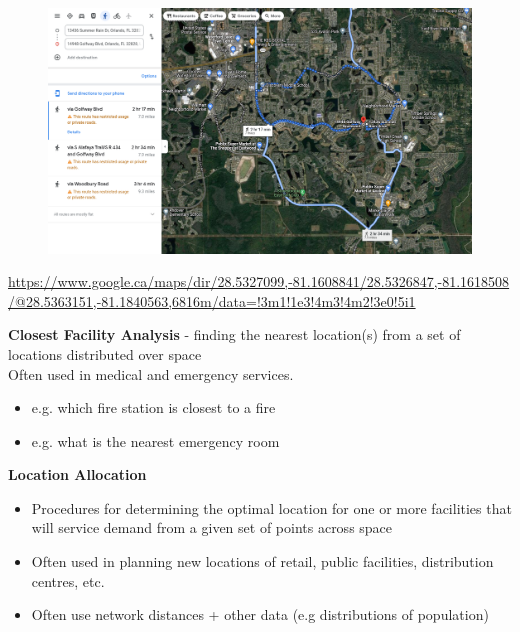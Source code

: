 \documentclass[aspectratio=169]{beamer}
\begin{document}
\begin{frame}
	
	\begin{figure}
		\centering
		\includegraphics[width=0.95 \linewidth]{images/stupid_route_orlando}
	\end{figure}
	\tiny \url{https://www.google.ca/maps/dir/28.5327099,-81.1608841/28.5326847,-81.1618508/@28.5363151,-81.1840563,6816m/data=!3m1!1e3!4m3!4m2!3e0!5i1}
\end{frame}








\begin{frame}

	\textbf{Closest Facility Analysis} - finding the nearest location(s) from a set of locations distributed over space \\
	\vspace{3mm}
	Often used in medical and emergency services. 
	\begin{itemize}
		\item e.g. which fire station is closest to a fire
		\item e.g. what is the nearest emergency room
	\end{itemize}
\end{frame}

\begin{frame}

	
	\textbf{Location Allocation}
	\begin{itemize}
		\item Procedures for determining the optimal location for one or more facilities that will service demand from a given set of points across space
		\item Often used in planning new locations of retail, public facilities, distribution centres, etc.
		\item Often use network distances + other data (e.g distributions of population)
	\end{itemize}
	
\end{frame}
\end{document}
